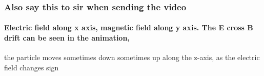 \documentclass[11pt]{article}
\begin{document}
    \hypertarget{also-say-this-to-sir-when-sending-the-video}{%
\subsubsection{Also say this to sir when sending the
video}\label{also-say-this-to-sir-when-sending-the-video}}

\hypertarget{electric-field-along-x-axis-magnetic-field-along-y-axis.-the-e-cross-b-drift-can-be-seen-in-the-animation}{%
\paragraph{Electric field along x axis, magnetic field along y axis. The
E cross B drift can be seen in the
animation,}\label{electric-field-along-x-axis-magnetic-field-along-y-axis.-the-e-cross-b-drift-can-be-seen-in-the-animation}}

the particle moves sometimes down sometimes up along the z-axis, as the
electric field changes sign
\end{document}
